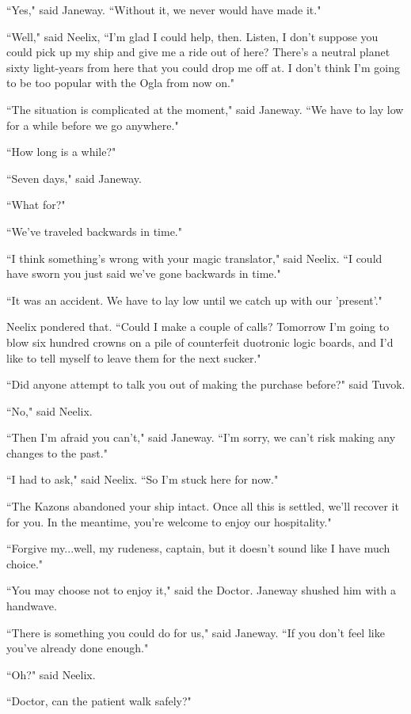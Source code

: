 \documentclass[twoside,letterpaper,12pt]{memoir}
\begin{document}
``Yes," said Janeway. ``Without it, we never would have made it." 

``Well," said Neelix, ``I'm glad I could help, then. Listen, I don't suppose you could pick up my ship and give me a ride out of here? There's a neutral planet sixty light-years from here that you could drop me off at. I don't think I'm going to be too popular with the Ogla from now on." 

``The situation is complicated at the moment," said Janeway. ``We have to lay low for a while before we go anywhere." 

``How long is a while?" 

``Seven days," said Janeway. 

``What for?" 

``We've traveled backwards in time." 

``I think something's wrong with your magic translator," said Neelix. ``I could have sworn you just said we've gone backwards in time." 

``It was an accident. We have to lay low until we catch up with our 'present'." 

Neelix pondered that. ``Could I make a couple of calls? Tomorrow I'm going to blow six hundred crowns on a pile of counterfeit duotronic logic boards, and I'd like to tell myself to leave them for the next sucker." 

``Did anyone attempt to talk you out of making the purchase before?" said Tuvok. 

``No," said Neelix. 

``Then I'm afraid you can't," said Janeway. ``I'm sorry, we can't risk making any changes to the past." 

``I had to ask," said Neelix. ``So I'm stuck here for now." 

``The Kazons abandoned your ship intact. Once all this is settled, we'll recover it for you. In the meantime, you're welcome to enjoy our hospitality." 

``Forgive my...well, my rudeness, captain, but it doesn't sound like I have much choice." 

``You may choose not to enjoy it," said the Doctor. Janeway shushed him with a handwave. 

``There is something you could do for us," said Janeway. ``If you don't feel like you've already done enough." 

``Oh?" said Neelix. 

``Doctor, can the patient walk safely?" 
\end{document}
